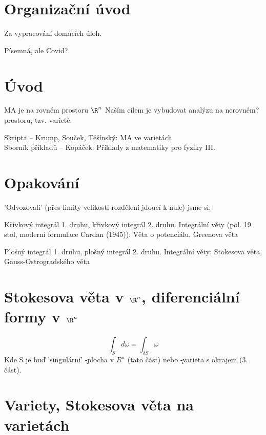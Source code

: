 \documentclass[12pt]{article}					%
\begin{document}
\section*{Organizační úvod}
    \begin{poznamka}[Zápočet]
        Za vypracování domácích úloh.
    \end{poznamka}
    \begin{poznamka}[Zkouška]
        Písemná, ale Covid?
    \end{poznamka}
\section*{Úvod}
    MA je na rovném prostoru $\R^n$
    Naším cílem je vybudovat analýzu na nerovném? prostoru, tzv. varietě.
    \begin{poznamka}[literatura]
        Skripta -- Krump, Souček, Těšínský: MA ve varietách\\
        Sborník příkladů -- Kopáček: Příklady z matematiky pro fyziky III.
    \end{poznamka}

\section{Opakování}
\noindent 'Odvozovali' (přes limity velikosti rozdělení jdoucí k nule) jsme si:

    Křivkový integrál 1. druhu, křivkový integrál 2. druhu. Integrální věty (pol. 19. stol, moderní formulace Cardan (1945)): Věta o potenciálu, Greenova věta

    Plošný integrál 1. druhu, plošný integrál 2. druhu. Integrální věty: Stokesova věta, Gauss-Ostrogradského věta





\section{Stokesova věta v $\R^n$, diferenciální formy v $\R^n$}
    \begin{veta}[Moderní (= obecná) formulace Stokesovy věty]
        $$ \int_{S} {d\omega} = \int_{\delta S}\omega $$
        Kde S je buď 'singulární' \k-plocha v $R^n$ (tato část) nebo \k-varieta s okrajem (3. část).
          
    \end{veta}


\section{Variety, Stokesova věta na varietách}

    
\end{document}
